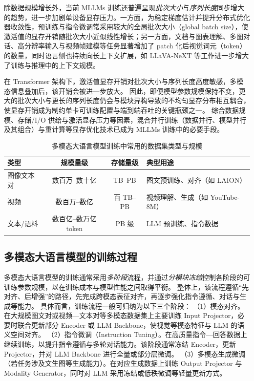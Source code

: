 除数据规模增长外，当前 MLLMs 训练还普遍呈现\emph{批次大小}与\emph{序列长度}同步增大的趋势，进一步加剧单设备显存压力。一方面，为稳定梯度估计并提升分布式优化器收敛性，预训练与指令微调常采用较大的全局批次大小（global batch size），使激活值的显存开销随批次大小近似线性增长；另一方面，文档与图表理解、多图对话、高分辨率输入与视频帧建模等任务显著增加了 patch 化后视觉词元（token）的数量，同时语言侧也持续向长上下文扩展\cite{long_context_benchmark2024}，如 LLaVA-NeXT 等工作进一步增大了训练与推理中的上下文规模\cite{llava_next2024}。

在 Transformer 架构下，激活值显存开销对批次大小与序列长度高度敏感，多模态信息叠加后，该开销会被进一步放大。
因此，即便模型参数规模保持不变，更大的批次大小与更长的序列长度仍会与模块异构导致的不均匀显存分布相互耦合，使显存开销成为制约单卡可训练配置与端到端吞吐的关键瓶颈之一。
综合数据规模、存储/I/O 供给与激活显存压力等因素，混合并行训练（数据并行、模型并行及其组合）与重计算等显存优化技术已成为 MLLMs 训练中的必要手段。

\begin{table}[htbp]
  \centering
  \caption{多模态大语言模型训练中常用的数据集类型与规模}
  \label{tab:mllm_data_scale}
  \begin{tabular}{lccp{5.5cm}}
    \toprule
    类型     & 规模量级        & 存储量级 & 典型用途 \\
    \midrule
    图像文本对     & 数百万--数十亿  & TB--PB   & 图文预训练、对齐（如 LAION\cite{laion5b2022}） \\
    视频     & 数百万--数亿    & 百 TB--PB & 视频理解、生成（如 YouTube-8M\cite{youtube8m}） \\
    文本/语料 & 数百亿--数万亿 token & PB 级   & LLM 预训练、指令数据 \\
    \bottomrule
  \end{tabular}
\end{table}

\subsection{多模态大语言模型的训练过程}

多模态大语言模型的训练通常采用\emph{多阶段}流程，并通过\emph{分模块冻结}控制各阶段的可训练参数规模，以在训练成本与模型性能之间取得平衡\cite{blip2,llava2023}。
整体上，该流程遵循“先对齐、后增强”的路径，先完成跨模态表征对齐，再逐步强化指令遵循、对话与生成等能力。
具体而言，训练流程一般可归纳为以下三个阶段：
（1）模态对齐。在大规模图文对或视频—文本对等多模态数据集上主要训练 Input Projector，必要时联合更新部分 Encoder 或 LLM Backbone，使视觉等模态特征与 LLM 的语义空间对齐。
（2）指令微调（Instruction Tuning）。在高质量指令—回答数据上继续训练，以提升指令遵循与多轮对话能力。该阶段通常冻结 Encoder，更新 Projector，并对 LLM Backbone 进行全量或部分层微调。
（3）多模态生成微调（若任务涉及文生图等生成能力）。在对应生成数据上训练 Output Projector 与 Modality Generator，同时对 LLM 采用冻结或低秩微调等轻量更新方式。

